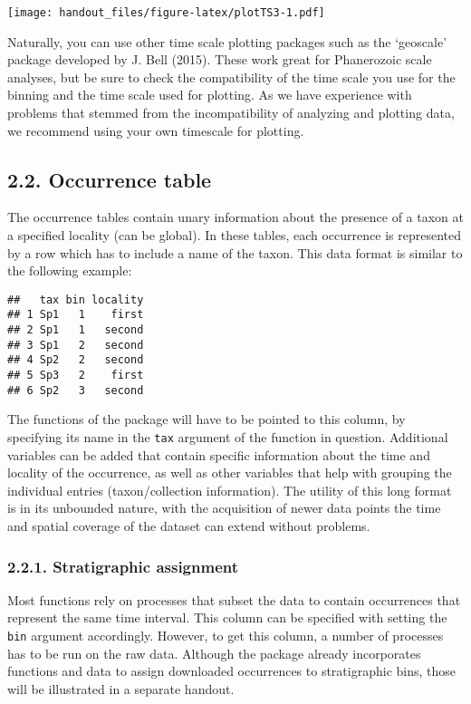 \documentclass[]{article}
\begin{document}
\texttt{[image: handout\_files/figure-latex/plotTS3-1.pdf]}

Naturally, you can use other time scale plotting packages such as the
`geoscale' package developed by J. Bell (2015). These work great for
Phanerozoic scale analyses, but be sure to check the compatibility of
the time scale you use for the binning and the time scale used for
plotting. As we have experience with problems that stemmed from the
incompatibility of analyzing and plotting data, we recommend using your
own timescale for plotting.

\hypertarget{occurrence-table}{%
\subsection{2.2. Occurrence table}\label{occurrence-table}}

The occurrence tables contain unary information about the presence of a
taxon at a specified locality (can be global). In these tables, each
occurrence is represented by a row which has to include a name of the
taxon. This data format is similar to the following example:

\begin{verbatim}
##   tax bin locality
## 1 Sp1   1    first
## 2 Sp1   1   second
## 3 Sp1   2   second
## 4 Sp2   2   second
## 5 Sp3   2    first
## 6 Sp2   3   second
\end{verbatim}

The functions of the package will have to be pointed to this column, by
specifying its name in the \texttt{tax} argument of the function in
question. Additional variables can be added that contain specific
information about the time and locality of the occurrence, as well as
other variables that help with grouping the individual entries
(taxon/collection information). The utility of this long format is in
its unbounded nature, with the acquisition of newer data points the time
and spatial coverage of the dataset can extend without problems.

\hypertarget{stratigraphic-assignment}{%
\subsubsection{2.2.1. Stratigraphic
assignment}\label{stratigraphic-assignment}}

Most functions rely on processes that subset the data to contain
occurrences that represent the same time interval. This column can be
specified with setting the \texttt{bin} argument accordingly. However,
to get this column, a number of processes has to be run on the raw data.
Although the package already incorporates functions and data to assign
downloaded occurrences to stratigraphic bins, those will be illustrated
in a separate handout.
\end{document}
